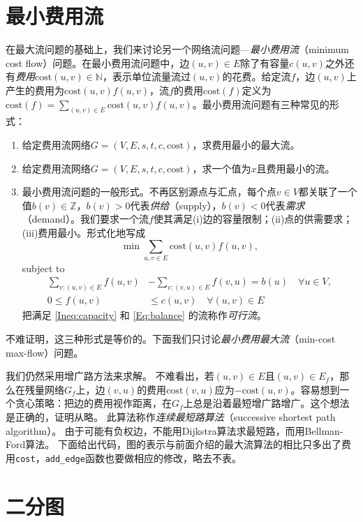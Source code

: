 \documentclass[a4paper]{ctexbook}
\newcommand{\cost}{\mathrm{cost}}
\begin{document}
  \section{最小费用流}
  在最大流问题的基础上，我们来讨论另一个网络流问题---\emph{最小费用流}（minimum cost flow）问题。在最小费用流问题中，边$(u,v)\in E$除了有容量$c(u,v)$之外还有\emph{费用}$\cost(u,v)\in\mathbb{N}$，表示单位流量流过$(u,v)$的花费。给定流$f$，边$(u,v)$上产生的费用为$\cost(u,v) f(u,v)$，流$f$的费用$\cost(f)$定义为$\cost(f) = \sum_{(u,v)\in E}\cost(u,v)f(u,v)$。最小费用流问题有三种常见的形式：
  \begin{enumerate}
    \item 给定费用流网络$G=(V,E,s,t,c,\cost)$，求费用最小的最大流。
    \item 给定费用流网络$G=(V,E,s,t,c,\cost)$，求一个值为$x$且费用最小的流。
    \item 最小费用流问题的一般形式。不再区别源点与汇点，每个点$v\in V$都关联了一个值$b(v)\in\mathbb{Z}$，$b(v)>0$代表\emph{供给}（supply），$b(v)<0$代表\emph{需求}（demand）。我们要求一个流$f$使其满足(i)边的容量限制；(ii)点的供需要求；(iii)费用最小。形式化地写成
    \begin{equation}
      \min\sum_{{u,v}\in E}\cost(u,v)f(u,v), \label{mcf-obj}
    \end{equation}
    subject to
    \begin{align}
      \sum_{v\colon(u,v)\in E} f(u,v) &- \sum_{v\colon(v,u)\in E}f(v,u) = b(u) \quad \forall u\in V,\label{Ineq:capacity}\\
      0\le f(u,v)&\le c(u,v)\quad \forall(u,v)\in E\label{Eq:balance} %
    \end{align}
    把满足 \eqref{Ineq:capacity} 和 \eqref{Eq:balance} 的流称作\emph{可行流}。
  \end{enumerate}
  不难证明，这三种形式是等价的。下面我们只讨论\emph{最小费用最大流}（min-cost max-flow）问题。

  我们仍然采用增广路方法来求解。
  不难看出，若$(u,v)\in E$且$(u,v)\in E_f$，那么在残量网络$G_f$上，边$(v,u)$的费用$\cost(v,u)$应为$-\cost(u,v)$。容易想到一个贪心策略：把边的费用视作距离，在$G_f$上总是沿着最短增广路增广。这个想法是正确的，证明从略。%
  此算法称作\emph{连续最短路算法}（successive shortest path algorithm）。
  由于可能有负权边，不能用Dijkstra算法求最短路，而用Bellman-Ford算法。
  下面给出代码，图的表示与前面介绍的最大流算法的相比只多出了费用\texttt{cost}，\texttt{add\_edge}函数也要做相应的修改，略去不表。
  
  \section{二分图}
\end{document}
